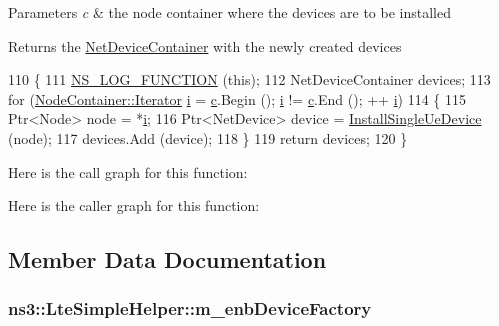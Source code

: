 \begin{DoxyParams}{Parameters}
{\em c} & the node container where the devices are to be installed\\
\hline
\end{DoxyParams}
\begin{DoxyReturn}{Returns}
the \hyperlink{classns3_1_1NetDeviceContainer}{Net\+Device\+Container} with the newly created devices 
\end{DoxyReturn}

\begin{DoxyCode}
110 \{
111   \hyperlink{log-macros-disabled_8h_a90b90d5bad1f39cb1b64923ea94c0761}{NS\_LOG\_FUNCTION} (\textcolor{keyword}{this});
112   NetDeviceContainer devices;
113   \textcolor{keywordflow}{for} (\hyperlink{classns3_1_1NodeContainer_aa1a9f2d2b09bfef7d066d3974bca2cc4}{NodeContainer::Iterator} \hyperlink{bernuolliDistribution_8m_a6f6ccfcf58b31cb6412107d9d5281426}{i} = \hyperlink{lte_2model_2fading-traces_2fading__trace__generator_8m_ae0323a9039add2978bf5b49550572c7c}{c}.Begin (); \hyperlink{bernuolliDistribution_8m_a6f6ccfcf58b31cb6412107d9d5281426}{i} != \hyperlink{lte_2model_2fading-traces_2fading__trace__generator_8m_ae0323a9039add2978bf5b49550572c7c}{c}.End (); ++
      \hyperlink{bernuolliDistribution_8m_a6f6ccfcf58b31cb6412107d9d5281426}{i})
114     \{
115       Ptr<Node> node = *\hyperlink{bernuolliDistribution_8m_a6f6ccfcf58b31cb6412107d9d5281426}{i};
116       Ptr<NetDevice> device = \hyperlink{classns3_1_1LteSimpleHelper_a4416da6e8b2bb30909b32b9a82dfd4c0}{InstallSingleUeDevice} (node);
117       devices.Add (device);
118     \}
119   \textcolor{keywordflow}{return} devices;
120 \}
\end{DoxyCode}


Here is the call graph for this function\+:




Here is the caller graph for this function\+:




\subsection{Member Data Documentation}
\subsubsection[{\texorpdfstring{m\+\_\+enb\+Device\+Factory}{m_enbDeviceFactory}}]{ ns3\+::\+Lte\+Simple\+Helper\+::m\+\_\+enb\+Device\+Factory\hspace{0.3cm}{\ttfamily [private]}}\hypertarget{classns3_1_1LteSimpleHelper_a4ba91d9ba3663ad56199d198ed18f4ee}{}\label{classns3_1_1LteSimpleHelper_a4ba91d9ba3663ad56199d198ed18f4ee}
